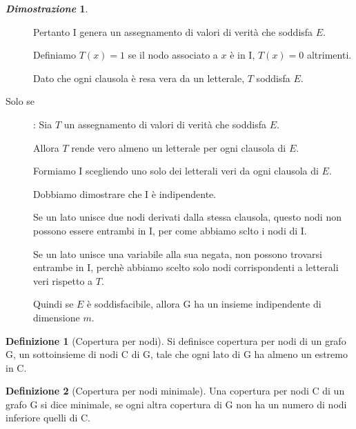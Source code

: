 \documentclass[12pt]{article}
\theoremstyle{definition}
\newtheorem*{mydef}{Definizione}
\newtheorem*{myproof}{\em Dimostrazione}
\begin{document}
\begin{myproof}
\begin{description}
    Pertanto I genera un assegnamento di valori di verit\`a che soddisfa \(E\).

    Definiamo \(T(x)=1\) se il nodo associato a \(x\) \`e in I, \(T(x)=0\) altrimenti.\newline

    Dato che ogni clausola \`e resa vera da un letterale, \(T\) soddisfa \(E\).\newline

  \item[Solo se]: Sia \(T\) un assegnamento di valori di verit\`a che soddisfa \(E\).\newline

    Allora \(T\) rende vero almeno un letterale per ogni clausola di \(E\).\newline

    Formiamo I scegliendo uno solo dei letterali veri da ogni clausola di \(E\).

    Dobbiamo dimostrare che I \`e indipendente.\newline

    Se un lato unisce due nodi derivati dalla stessa clausola, questo nodi non possono essere entrambi in I,
    per come abbiamo sclto i nodi di I.\newline

    Se un lato unisce una variabile alla sua negata, non possono trovarsi entrambe in I, perch\`e
    abbiamo scelto solo nodi corrispondenti a letterali veri rispetto a \(T\).\newline

    Quindi se \(E\) \`e soddisfacibile, allora G ha un insieme indipendente di dimensione \(m\).

  \end{description}

  \hfill \qedsymbol
\end{myproof}

\begin{mydef}[Copertura per nodi]
  Si definisce copertura per nodi di un grafo G, un sottoinsieme di nodi C di G, tale che ogni
  lato di G ha almeno un estremo in C.
\end{mydef}

\begin{mydef}[Copertura per nodi minimale]
  Una copertura per nodi C di un grafo G si dice minimale, se ogni altra copertura di G non ha un numero
  di nodi inferiore quelli di C.
\end{mydef}
\end{document}
